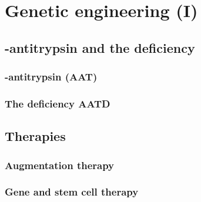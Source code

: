 \chapter{Genetic engineering (I)}

\lipsum[23]


\section{-antitrypsin and the deficiency}
\subsection{-antitrypsin (AAT)}

\subsection{The deficiency AATD}

\section{Therapies}
\subsection{Augmentation therapy}

\subsection{Gene and stem cell therapy}


